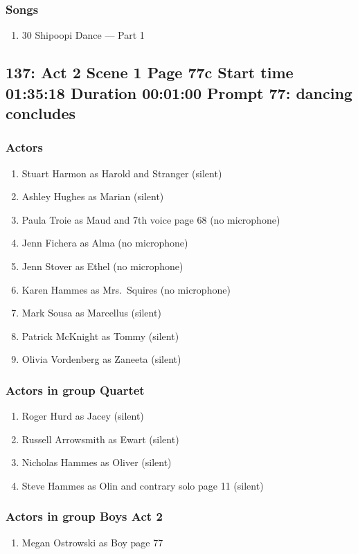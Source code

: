 \subsubsection{Songs}
\begin{enumerate}
\item 30 Shipoopi Dance --- Part 1
\end{enumerate}
\subsection{137: Act 2 Scene 1 Page 77c Start time 01:35:18 Duration 00:01:00 Prompt 77: dancing concludes}

\subsubsection{Actors}
\begin{enumerate}
\item Stuart Harmon as Harold and Stranger (silent)
\item Ashley Hughes as Marian (silent)
\item Paula Troie as Maud and 7th voice page 68 (no microphone)
\item Jenn Fichera as Alma (no microphone)
\item Jenn Stover as Ethel (no microphone)
\item Karen Hammes as Mrs.~Squires (no microphone)
\item Mark Sousa as Marcellus (silent)
\item Patrick McKnight as Tommy (silent)
\item Olivia Vordenberg as Zaneeta (silent)
\end{enumerate}
\subsubsection{Actors in group Quartet}
\begin{enumerate}
\item Roger Hurd as Jacey (silent)
\item Russell Arrowsmith as Ewart (silent)
\item Nicholas Hammes as Oliver (silent)
\item Steve Hammes as Olin and contrary solo page 11 (silent)
\end{enumerate}
\subsubsection{Actors in group Boys Act 2}
\begin{enumerate}
\item Megan Ostrowski as Boy page 77
\end{enumerate}

